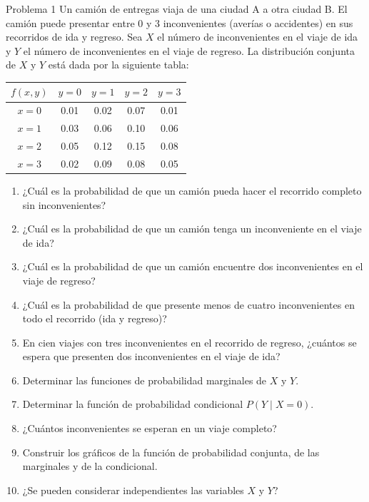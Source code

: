\documentclass[11pt,letterpaper]{article}
\begin{document}
\begin{problema}{Problema 1}
Un camión de entregas viaja de una ciudad A a otra ciudad B. El camión puede presentar entre 0 y 3 inconvenientes (averías o accidentes) en sus recorridos de ida y regreso. Sea \(X\) el número de inconvenientes en el viaje de ida y \(Y\) el número de inconvenientes en el viaje de regreso. La distribución conjunta de \(X\) y \(Y\) está dada por la siguiente tabla:

\begin{center}
\begin{tabular}{c|cccc}
\toprule
\(f(x,y)\) & \(y=0\) & \(y=1\) & \(y=2\) & \(y=3\) \\
\midrule
\(x=0\) & 0.01 & 0.02 & 0.07 & 0.01 \\
\(x=1\) & 0.03 & 0.06 & 0.10 & 0.06 \\
\(x=2\) & 0.05 & 0.12 & 0.15 & 0.08 \\
\(x=3\) & 0.02 & 0.09 & 0.08 & 0.05 \\
\bottomrule
\end{tabular}
\end{center}

\begin{enumerate}
\item ¿Cuál es la probabilidad de que un camión pueda hacer el recorrido completo sin inconvenientes?
\item ¿Cuál es la probabilidad de que un camión tenga un inconveniente en el viaje de ida?
\item ¿Cuál es la probabilidad de que un camión encuentre dos inconvenientes en el viaje de regreso?
\item ¿Cuál es la probabilidad de que presente menos de cuatro inconvenientes en todo el recorrido (ida y regreso)?
\item En cien viajes con tres inconvenientes en el recorrido de regreso, ¿cuántos se espera que presenten dos inconvenientes en el viaje de ida?
\item Determinar las funciones de probabilidad marginales de \(X\) y \(Y\).
\item Determinar la función de probabilidad condicional \(P(Y\mid X=0)\).
\item ¿Cuántos inconvenientes se esperan en un viaje completo?
\item Construir los gráficos de la función de probabilidad conjunta, de las marginales y de la condicional.
\item ¿Se pueden considerar independientes las variables \(X\) y \(Y\)?
\end{enumerate}
\end{problema}
\end{document}
